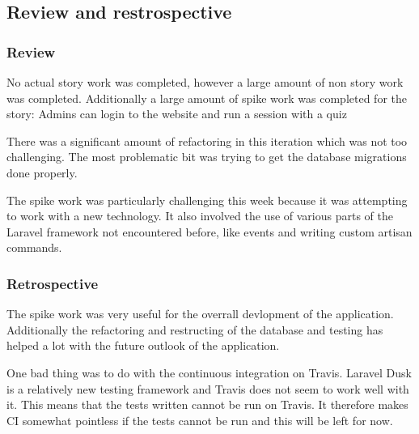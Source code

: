 \subsection{Review and restrospective}
\subsubsection{Review}
No actual story work was completed, however a large amount of non story work was completed. Additionally a large amount of spike work was completed for the story: Admins can login to the website and run a session with a quiz

There was a significant amount of refactoring in this iteration which was not too challenging. The most problematic bit was trying to get the database migrations done properly.

The spike work was particularly challenging this week because it was attempting to work with a new technology. It also involved the use of various parts of the Laravel framework not encountered before, like events and writing custom artisan commands.

\subsubsection{Retrospective}
The spike work was very useful for the overrall devlopment of the application. Additionally the refactoring and restructing of the database and testing has helped a lot with the future outlook of the application.

One bad thing was to do with the continuous integration on Travis. Laravel Dusk is a relatively new testing framework and Travis does not seem to work well with it. This means that the tests written cannot be run on Travis. It therefore makes CI somewhat pointless if the tests cannot be run and this will be left for now.
\newpage
